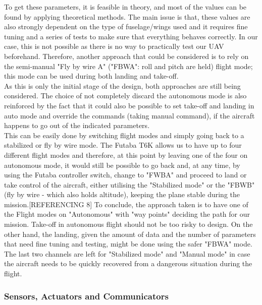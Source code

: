 \documentclass[12pt]{article}
\begin{document}
\noindent To get these parameters, it is feasible in theory, and most of the values can be found by applying theoretical methods. The main issue is that, these values are also strongly dependent on the type of fuselage/wings used and it requires fine tuning and a series of tests to make sure that everything behaves correctly. In our case, this is not possible as there is no way to practically test our UAV beforehand. Therefore, another approach that could be considered is to rely on the semi-manual "Fly by wire A" ("FBWA": roll and pitch are held) flight mode; this mode can be used during both landing and take-off. \\

\noindent As this is only the initial stage of the design, both approaches are still being considered. The choice of not completely discard the autonomous mode is also reinforced by the fact that it could also be possible to set take-off and landing in auto mode and override the commands (taking manual command), if the aircraft happens to go out of the indicated parameters. \\

\noindent This can be easily done by switching flight modes and simply going back to a stabilized or fly by wire mode. The Futaba T6K allows us to have up to four different flight modes and therefore, at this point by leaving one of the four on autonomous mode, it would still be possible to go back and, at any time, by using the Futaba controller switch, change to "FWBA" and proceed to land or take control of the aircraft, either utilising the "Stabilized mode" or the "FBWB" (fly by wire - which also holds altitude), keeping the plane stable during the mission.[REFERENCING 8] To conclude, the approach taken is to have one of the Flight modes on "Autonomous" with "way points" deciding the path for our mission. Take-off in autonomous flight should not be too risky to design. On the other hand, the landing, given the amount of data and the number of parameters that need fine tuning and testing, might be done using the safer "FBWA" mode. \\

\noindent The last two channels are left for "Stabilized mode" and "Manual mode" in case the aircraft needs to be quickly recovered from a dangerous situation during the flight. \\

\subsubsection{Sensors, Actuators and Communicators}
\end{document}
